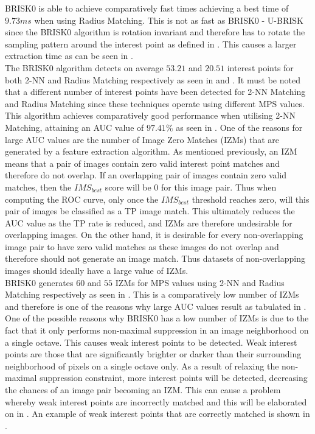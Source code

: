 BRISK0 is able to achieve comparatively fast times achieving a best time of $9.73 ms$ when using Radius Matching. This is not as fast as BRISK0 - U-BRISK since the BRISK0 algorithm is rotation invariant and therefore has to rotate the sampling pattern around the interest point as defined in . This causes a larger extraction time as can be seen in .\\

The BRISK0 algorithm detects on average $53.21$ and $20.51$ interest points for both 2-NN and Radius Matching respectively as seen in  and . It must be noted that a different number of interest points have been detected for 2-NN Matching and Radius Matching since these techniques operate using different MPS values. \\

This algorithm achieves comparatively good performance when utilising 2-NN Matching, attaining an AUC value of $97.41\%$ as seen in . One of the reasons for large AUC values are the number of Image Zero Matches (IZMs) that are generated by a feature extraction algorithm. As mentioned previously, an IZM means that a pair of images contain zero valid interest point matches and therefore do not overlap. If an overlapping pair of images contain zero valid matches, then the $IMS_{best}$ score will be $0$ for this image pair. Thus when computing the ROC curve, only once the $IMS_{best}$ threshold reaches zero, will this pair of images be classified as a TP image match. This ultimately reduces the AUC value as the TP rate is reduced, and IZMs are therefore undesirable for overlapping images. On the other hand, it is desirable for every non-overlapping image pair to have zero valid matches as these images do not overlap and therefore should not generate an image match. Thus datasets of non-overlapping images should ideally have a large value of IZMs.\\

BRISK0 generates $60$ and $55$ IZMs for MPS values using 2-NN and Radius Matching respectively as seen in . This is a comparatively low number of IZMs and therefore is one of the reasons why large AUC values result as tabulated in . One of the possible reasons why BRISK0 has a low number of IZMs is due to the fact that it only performs non-maximal suppression in an image neighborhood on a single octave. This causes weak interest points to be detected. Weak interest points are those that are significantly brighter or darker than their surrounding neighborhood of pixels on a single octave only. As a result of relaxing the non-maximal suppression constraint, more interest points will be detected, decreasing the chances of an image pair becoming an IZM. This can cause a problem whereby weak interest points are incorrectly matched and this will be elaborated on in . An example of weak interest points that are correctly matched is shown in .\\

